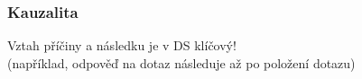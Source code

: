 \documentclass[usenames,dvipsnames,9pt]{beamer}
\begin{document}

\begin{frame}
  \frametitle{Kauzalita}

  \begin{center}
  	{\LARGE Vztah příčiny a následku je v DS klíčový!} \\
  	(například, odpověď na dotaz následuje až po položení dotazu)

  	\vspace{1.5em}


\end{center}
\end{frame}
\end{document}
